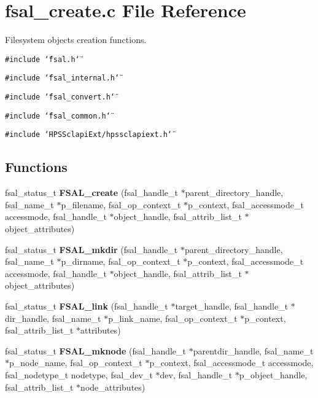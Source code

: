 \section{fsal\_\-create.c File Reference}
\label{fsal__create_8c}
Filesystem objects creation functions. 

{\tt \#include \char`\"{}fsal.h\char`\"{}}\par
{\tt \#include \char`\"{}fsal\_\-internal.h\char`\"{}}\par
{\tt \#include \char`\"{}fsal\_\-convert.h\char`\"{}}\par
{\tt \#include \char`\"{}fsal\_\-common.h\char`\"{}}\par
{\tt \#include \char`\"{}HPSSclapi\-Ext/hpssclapiext.h\char`\"{}}\par
\subsection*{Functions}
\begin{CompactItemize}
\item 
fsal\_\-status\_\-t {\bf FSAL\_\-create} (fsal\_\-handle\_\-t $\ast$parent\_\-directory\_\-handle, fsal\_\-name\_\-t $\ast$p\_\-filename, fsal\_\-op\_\-context\_\-t $\ast$p\_\-context, fsal\_\-accessmode\_\-t accessmode, fsal\_\-handle\_\-t $\ast$object\_\-handle, fsal\_\-attrib\_\-list\_\-t $\ast$object\_\-attributes)
\item 
fsal\_\-status\_\-t {\bf FSAL\_\-mkdir} (fsal\_\-handle\_\-t $\ast$parent\_\-directory\_\-handle, fsal\_\-name\_\-t $\ast$p\_\-dirname, fsal\_\-op\_\-context\_\-t $\ast$p\_\-context, fsal\_\-accessmode\_\-t accessmode, fsal\_\-handle\_\-t $\ast$object\_\-handle, fsal\_\-attrib\_\-list\_\-t $\ast$object\_\-attributes)
\item 
fsal\_\-status\_\-t {\bf FSAL\_\-link} (fsal\_\-handle\_\-t $\ast$target\_\-handle, fsal\_\-handle\_\-t $\ast$dir\_\-handle, fsal\_\-name\_\-t $\ast$p\_\-link\_\-name, fsal\_\-op\_\-context\_\-t $\ast$p\_\-context, fsal\_\-attrib\_\-list\_\-t $\ast$attributes)
\item 
fsal\_\-status\_\-t {\bf FSAL\_\-mknode} (fsal\_\-handle\_\-t $\ast$parentdir\_\-handle, fsal\_\-name\_\-t $\ast$p\_\-node\_\-name, fsal\_\-op\_\-context\_\-t $\ast$p\_\-context, fsal\_\-accessmode\_\-t accessmode, fsal\_\-nodetype\_\-t nodetype, fsal\_\-dev\_\-t $\ast$dev, fsal\_\-handle\_\-t $\ast$p\_\-object\_\-handle, fsal\_\-attrib\_\-list\_\-t $\ast$node\_\-attributes)
\end{CompactItemize}


